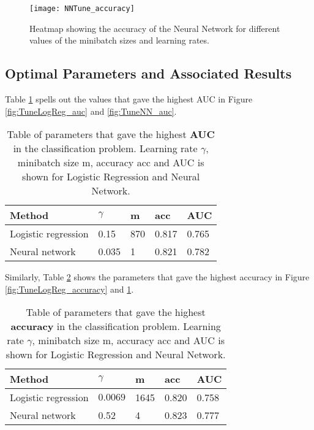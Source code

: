 \begin{figure}[htbp]
	\centering
	\texttt{[image: NNTune\_accuracy]}
	\caption{Heatmap showing the accuracy of the Neural Network for different
		values of the minibatch sizes and learning rates.}
	\label{fig:TuneNN_accuracy}
\end{figure}

\subsection*{Optimal Parameters and Associated Results}
Table \ref{tab:AUC} spells out the values that gave the highest AUC in Figure \ref{fig:TuneLogReg_auc} and \ref{fig:TuneNN_auc}.
\begin{table}[htbp]
	\renewcommand{\arraystretch}{1.2}
	\centering
	\caption{Table of parameters that gave the highest \textbf{AUC} in the classification problem. Learning rate $\gamma$, minibatch size m, accuracy acc and AUC is shown for Logistic Regression and Neural Network.}
	\begin{tabular}{p{18mm} p{10mm} p{10mm} p{10mm} p{10mm}}
		\toprule
		Method & $\gamma$ & m & acc & AUC \\
		\midrule
		Logistic \newline regression & 0.15 & 870 & 0.817 & 0.765 \\
		Neural \newline network & 0.035 & 1 & 0.821 & 0.782 \\
		\bottomrule
	\end{tabular}
	\label{tab:AUC}
\end{table}

Similarly, Table \ref{tab:acc} shows the parameters that gave the highest accuracy in Figure \ref{fig:TuneLogReg_accuracy} and \ref{fig:TuneNN_accuracy}.

\begin{table}[htbp]
	\renewcommand{\arraystretch}{1.2}
	\centering
	\caption{Table of parameters that gave the highest \textbf{accuracy} in the classification problem. Learning rate $\gamma$, minibatch size m, accuracy acc and AUC is shown for Logistic Regression and Neural Network.}
	\begin{tabular}{p{18mm} p{10mm} p{10mm} p{10mm} p{10mm}}
		\toprule
		Method & $\gamma$ & m & acc & AUC \\
		\midrule
		Logistic \newline regression & $0.0069$ & 1645 & 0.820 &  0.758\\
		Neural \newline network & 0.52 & 4 & 0.823 & 0.777 \\
		\bottomrule
	\end{tabular}
	\label{tab:acc}
\end{table}


